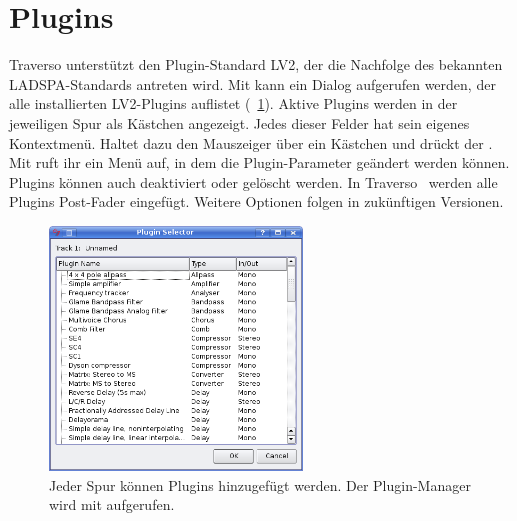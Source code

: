 \section{Plugins}
Traverso unterstützt den Plugin-Standard LV2, der die Nachfolge des bekannten LADSPA-Standards antreten wird. Mit  kann ein Dialog aufgerufen werden, der alle installierten LV2-Plugins auflistet (\FigB~\ref{fig_pluglist}). Aktive Plugins werden in der jeweiligen Spur als Kästchen angezeigt. Jedes dieser Felder hat sein eigenes Kontextmenü. Haltet dazu den Mauszeiger über ein Kästchen und drückt  der . Mit  ruft ihr ein Menü auf, in dem die Plugin-Parameter geändert werden können. Plugins können auch deaktiviert  oder gelöscht  werden. In Traverso \Version\ werden alle Plugins Post-Fader eingefügt. Weitere Optionen folgen in zukünftigen Versionen.

\begin{figure}[t]
 \centering\includegraphics[width=0.6\textwidth]{../images/plugin-list}
 \caption{Jeder Spur können Plugins hinzugefügt werden. Der Plugin-Manager wird mit  aufgerufen.}
 \label{fig_pluglist}
\end{figure}


